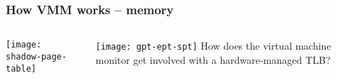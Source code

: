 \begin{frame}[plain]
	\frametitle{How VMM works -- memory}
	
	
	
	\begin{columns}
		
		\begin{column}{.4\textwidth}
			\centering
			\texttt{[image: shadow-page-table]}
			
		\end{column}
		
		\begin{column}{.6\textwidth}
			
			\texttt{[image: gpt-ept-spt]}
			 How does the virtual machine monitor get involved with a
			hardware-managed TLB?	
			
%				

			
			
		\end{column}
		
		
	\end{columns}
	
	
\end{frame}


